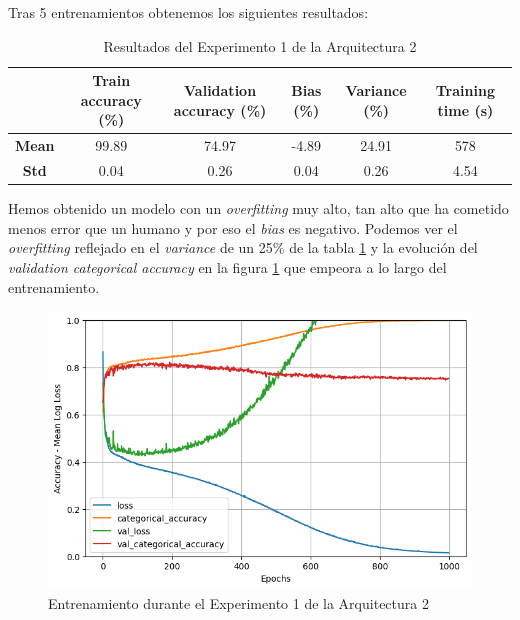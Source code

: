\documentclass{article}
\begin{document}
			Tras 5 entrenamientos obtenemos los siguientes resultados:
			
			\begin{table}[!h]
				\begin{center}
					\begin{tabular}{ c | c | c | c | c | c |}
						\ & \textbf{Train accuracy (\%)} & \textbf{Validation accuracy (\%)} & \textbf{Bias (\%)} & \textbf{Variance (\%)} & \textbf{Training time (s)} \\ \hline
						\textbf{Mean} & 99.89 & 74.97 & -4.89 & 24.91 & 578\\ \hline
						\textbf{Std} & 0.04 & 0.26 & 0.04 & 0.26 & 4.54 \\ \hline
					\end{tabular}
					\caption{Resultados del Experimento 1 de la Arquitectura 2}
					\label{tab:res-a2-e1}
				\end{center}
			\end{table}
			
			Hemos obtenido un modelo con un \textit{overfitting} muy alto, tan alto que ha cometido menos error que un humano y por eso el \textit{bias} es negativo. Podemos ver el \textit{overfitting} reflejado en el \textit{variance} de un 25\% de la tabla \ref{tab:res-a2-e1} y la evoluci\'on del \textit{validation categorical accuracy} en la figura \ref{tr-a2-e1} que empeora a lo largo del entrenamiento.
			
			\begin{figure}[!h]
				\begin{center}
					\includegraphics[scale=0.5]{tr-a2-e1.png}		
					\caption{Entrenamiento durante el Experimento 1 de la Arquitectura 2}	
					\label{tr-a2-e1}
				\end{center}
			\end{figure}
			
\end{document}
